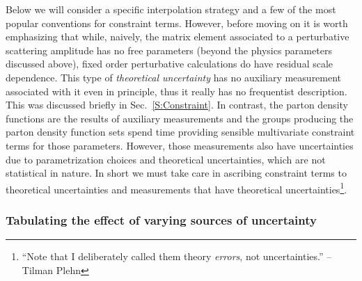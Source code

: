 Below we will consider a specific interpolation strategy and a few of the most popular conventions for constraint terms.  However, before moving on it is worth emphasizing that while, naively, the matrix element associated to a perturbative scattering amplitude has no free parameters (beyond the physics parameters discussed above), fixed order perturbative calculations do have residual  scale dependence.  This type of \textit{theoretical uncertainty} has no auxiliary measurement associated with it even in principle, thus it really has no frequentist description.  This was discussed briefly in Sec.~\ref{S:Constraint}.  In contrast, the parton density functions are the results of auxiliary measurements and the groups producing the parton density function sets spend time providing sensible multivariate constraint terms for those parameters.  However, those measurements also have uncertainties due to parametrization choices and theoretical uncertainties, which are not statistical in nature.  In short we must take care in ascribing constraint terms to theoretical uncertainties and measurements that have theoretical uncertainties\footnote{``Note that I deliberately called them theory \textit{errors}, not uncertainties.'' -- Tilman Plehn}.  


\subsubsection{Tabulating the effect of varying sources of uncertainty}


